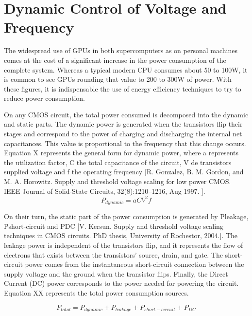 

\section{Dynamic Control of Voltage and Frequency}
\label{section:dcvf}


The widespread use of GPUs in both supercomputers as on personal machines comes at the cost of a significant increase in the power consumption of the complete system. Whereas a typical modern CPU consumes about 50 to 100W, it is common to see GPUs rounding that value to 200 to 300W of power. With these figures, it is indispensable the use of energy efficiency techniques to try to reduce power consumption.

On any CMOS circuit, the total power consumed is decomposed into the dynamic and static parts. The dynamic power is generated when the transistors flip their stages and correspond to the power of charging and discharging the internal net capacitances. This value is proportional to the frequency that this change occurs. Equation X represents the general form for dynamic power, where a represents the utilization factor, C the total capacitance of the circuit, V de transistors supplied voltage and f the operating frequency [R. Gonzalez, B. M. Gordon, and M. A. Horowitz. Supply and threshold voltage scaling for low power CMOS. IEEE Journal of Solid-State Circuits, 32(8):1210–1216, Aug 1997.
].
\begin{equation}
    P_{dynamic} = aCV^2f
\end{equation}


On their turn, the static part of the power consumption is generated by Pleakage, Pshort-circuit and PDC [V. Kersun. Supply and threshold voltage scaling techniques in CMOS circuits. PhD thesis, University of Rochestor, 2004.]. The leakage power is independent of the transistors flip, and it represents the flow of electrons that exists between the transistors' source, drain, and gate. The short-circuit power comes from the instantaneous short-circuit connection between the supply voltage and the ground when the transistor flips. Finally, the Direct Current (DC) power corresponds to the power needed for powering the circuit. Equation XX represents the total power consumption sources.

\begin{equation}
    P_{total} = P_{dynamic} + P_{leakage} + P_{short-circuit} + P_{DC}
\end{equation}

